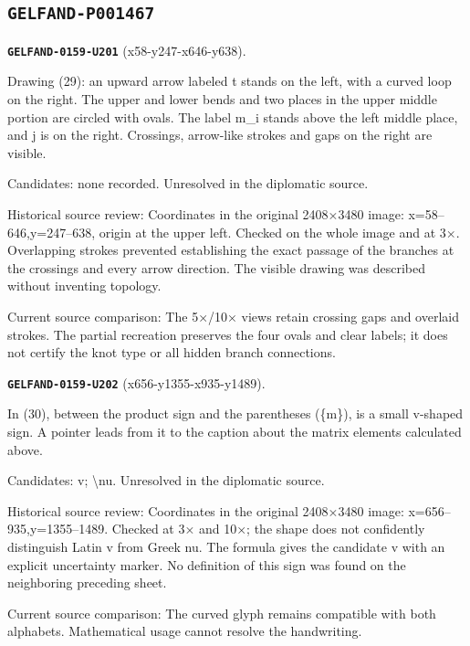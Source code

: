 \subsection*{\texttt{GELFAND-P001467}}
\par\noindent\leavevmode{}\label{GELFAND-0159-U201}\label{GELFAND-P001467:x58-y247-x646-y638}\textbf{\texttt{GELFAND-0159-U201}} (x58-y247-x646-y638).\nopagebreak[4]\par
Drawing (29): an upward arrow labeled t stands on the left, with a curved loop on the right. The upper and lower bends and two places in the upper middle portion are circled with ovals. The label m\_i stands above the left middle place, and j is on the right. Crossings, arrow-like strokes and gaps on the right are visible.\par
Candidates: none recorded. Unresolved in the diplomatic source.\par
Historical source review: Coordinates in the original 2408×3480 image: x=58–646,y=247–638, origin at the upper left. Checked on the whole image and at 3×. Overlapping strokes prevented establishing the exact passage of the branches at the crossings and every arrow direction. The visible drawing was described without inventing topology.\par
Current source comparison: The 5×/10× views retain crossing gaps and overlaid strokes. The partial recreation preserves the four ovals and clear labels; it does not certify the knot type or all hidden branch connections.\par\medskip
\par\noindent\leavevmode{}\label{GELFAND-0159-U202}\label{GELFAND-P001467:x656-y1355-x935-y1489}\textbf{\texttt{GELFAND-0159-U202}} (x656-y1355-x935-y1489).\nopagebreak[4]\par
In (30), between the product sign and the parentheses (\{m\}), is a small v-shaped sign. A pointer leads from it to the caption about the matrix elements calculated above.\par
Candidates: v; \textbackslash{}nu. Unresolved in the diplomatic source.\par
Historical source review: Coordinates in the original 2408×3480 image: x=656–935,y=1355–1489. Checked at 3× and 10×; the shape does not confidently distinguish Latin v from Greek nu. The formula gives the candidate v with an explicit uncertainty marker. No definition of this sign was found on the neighboring preceding sheet.\par
Current source comparison: The curved glyph remains compatible with both alphabets. Mathematical usage cannot resolve the handwriting.\par\medskip
